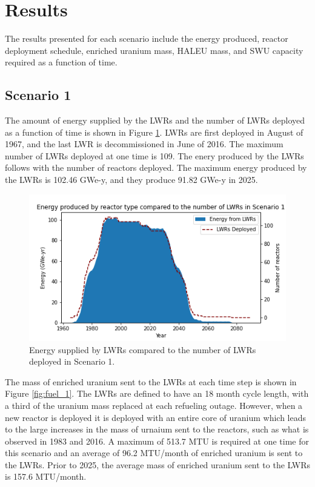 \section{Results}
The results presented for each scenario include the energy produced, reactor 
deployment schedule, enriched
uranium mass, \gls{HALEU} mass, and \gls{SWU} capacity required as a function of time. 

\subsection{Scenario 1}
The amount of energy supplied by the \glspl{LWR} and the number of \glspl{LWR}
deployed as a function of time is shown in Figure \ref{fig:energy_rx_1}. 
\glspl{LWR} are first deployed in August of 1967, and the last 
\gls{LWR} is decommissioned in June of 2016. The maximum number of 
\glspl{LWR} deployed at one time is 109. The enery produced by the 
\glspl{LWR} follows with the number of reactors deployed. The maximum energy 
produced by the \glspl{LWR} is 102.46 GWe-y, and they produce 91.82 GWe-y 
in 2025.

\begin{figure}
    \centering 
    \includegraphics[scale=0.5]{figures/energy_scenario1.png}
    \caption{Energy supplied by \glspl{LWR} compared to the number of 
    \glspl{LWR} deployed in Scenario 1.}
    \label{fig:energy_rx_1}
\end{figure}

The mass of enriched uranium sent to the \glspl{LWR} at each 
time step is shown in Figure \ref{fig:fuel_1}. The \glspl{LWR} are 
defined to have an 18 month cycle length, with a third of the uranium 
mass replaced at each refueling outage. However, when a new reactor 
is deployed it is deployed with an entire core of uranium which leads 
to the large increases in the mass of urnaium sent to the reactors, such 
as what is observed in 1983 and 2016. A maximum of 513.7 MTU  
is required at one time for this scenario and an average of 96.2 MTU/month 
of enriched uranium is sent to the \glspl{LWR}. Prior to 2025, the average mass
of enriched uranium sent to the \glspl{LWR} is 157.6 MTU/month. 

